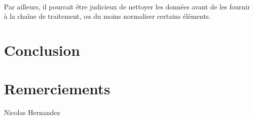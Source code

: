 \documentclass[a4paper,12pt]{article}
\begin{document}
\paragraph{}
Par ailleurs, il pourrait être judicieux de nettoyer les données avant de les fournir à la chaîne de traitement, ou du moins normaliser certains éléments.



\section*{Conclusion}



\section*{Remerciements}

Nicolas Hernandez
\end{document}
